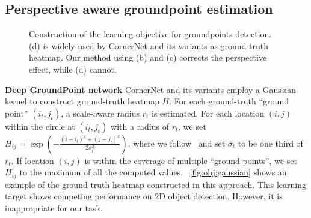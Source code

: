 \documentclass{article}
\begin{document}
\subsection{Perspective aware groundpoint estimation}
\label{sec:heatmap}








\begin{figure}
	\begin{center}
	\end{center}
	\caption{Construction of the learning objective for groundpoints detection. (d) is widely used by CornerNet and its variants as ground-truth heatmap.
	Our method using (b) and (c) corrects the perspective effect, while (d) cannot. }
	\label{fig:obj}
\end{figure}

\textbf{Deep GroundPoint network} CornerNet and its variants employ a Gaussian kernel to construct ground-truth heatmap $H$. For each ground-truth ``ground point'' $(i_t, j_t)$, a scale-aware radius
$r_t$ is estimated. For each location $(i,j)$ within the circle at $(i_t, j_t)$ with a radius of $r_t$, 
we set $H_{ij} = \exp\left(-\frac{(i - i_t)^2 + (j - j_t)^2}{2\sigma_t^2}\right)$, where we follow~\cite{law2018cornernet} and set $\sigma_t$ to be one third of  $r_t$. If location $(i,j)$ is within the coverage of multiple ``ground points'', we set $H_{ij}$ to the maximum of all the computed values.  
\figurename{~\ref{fig:obj:gaussian}} shows an example of the ground-truth heatmap constructed in this approach.
This learning target shows competing performance on 2D object detection. However, it is inappropriate for our task.
\end{document}
